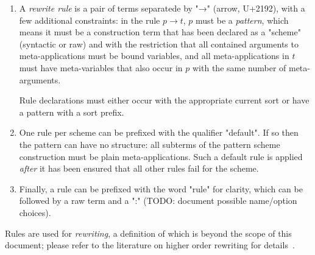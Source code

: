 \documentclass[11pt]{article} %
\begin{document}
\begin{manual}
\begin{enumerate}
  \item A \emph{rewrite rule} is a pair of terms separatede by "→" (arrow, U+2192), with a few
    additional constraints: in the rule $p→t$, $p$ must be a \emph{pattern}, which means it must be
    a construction term that has been declared as a "scheme" (syntactic or raw) and with the
    restriction that all contained arguments to meta-applications must be bound variables, and all
    meta-applications in $t$ must have meta-variables that also occur in $p$ with the same number of
    meta-arguments.

    Rule declarations must either occur with the appropriate current sort or have a pattern with a
    sort prefix.

  \item One rule per scheme can be prefixed with the qualifier "default". If so then the pattern can
    have no structure: all subterms of the pattern scheme construction must be plain
    meta-applications. Such a default rule is applied \emph{after} it has been ensured that all
    other rules fail for the scheme.

  \item Finally, a rule can be prefixed with the word "rule" for clarity, which can be followed by a
    raw term and a ":" (TODO: document possible name/option choices).

  \end{enumerate}
  Rules are used for \emph{rewriting}, a definition of which is beyond the scope of this document;
  please refer to the literature on higher order rewriting for details~\cite{Klop+:tcs1993}.
\end{manual}
\end{document}
